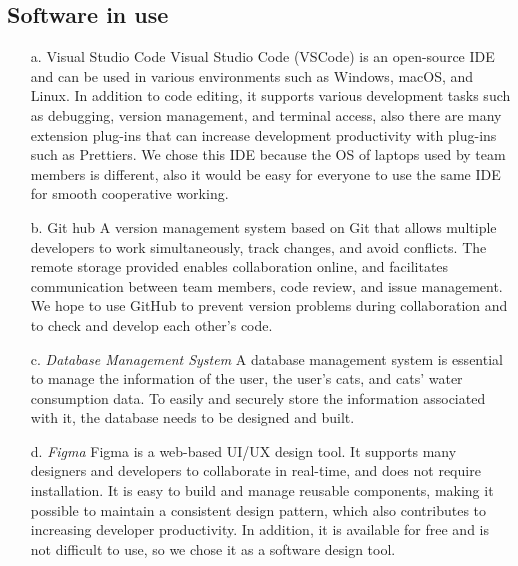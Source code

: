 \documentclass[conference]{IEEEtran}
\begin{document}
\subsection{Software in use}
\begin{itemize}
\item[a.]{Visual Studio Code}
   \newline
   Visual Studio Code (VSCode) is an open-source IDE and can be used in various environments such as Windows, macOS, and Linux. In addition to code editing, it supports various development tasks such as debugging, version management, and terminal access, also there are many extension plug-ins that can increase development productivity with plug-ins such as Prettiers. We chose this IDE because the OS of laptops used by team members is different, also it would be easy for everyone to use the same IDE for smooth cooperative working.
    \\ \end{itemize}
\begin{itemize}
\item[b.]{Git hub}
   \newline
   A version management system based on Git that allows multiple developers to work simultaneously, track changes, and avoid conflicts. The remote storage provided enables collaboration online, and facilitates communication between team members, code review, and issue management. We hope to use GitHub to prevent version problems during collaboration and to check and develop each other's code.
    \\ \end{itemize}
\begin{itemize}
\item[c.]{\emph{Database Management System}}
   \newline
   A database management system is essential to manage the information of the user, the user's cats, and cats’ water consumption data. To easily and securely store the information associated with it, the database needs to be designed and built.
    \\ \end{itemize}
\begin{itemize}
\item[d.]{\emph{Figma}}
   \newline
   Figma is a web-based UI/UX design tool. It supports many designers and developers to collaborate in real-time, and does not require installation. It is easy to build and manage reusable components, making it possible to maintain a consistent design pattern, which also contributes to increasing developer productivity. In addition, it is available for free and is not difficult to use, so we chose it as a software design tool.
    \\ \end{itemize}
\end{document}
